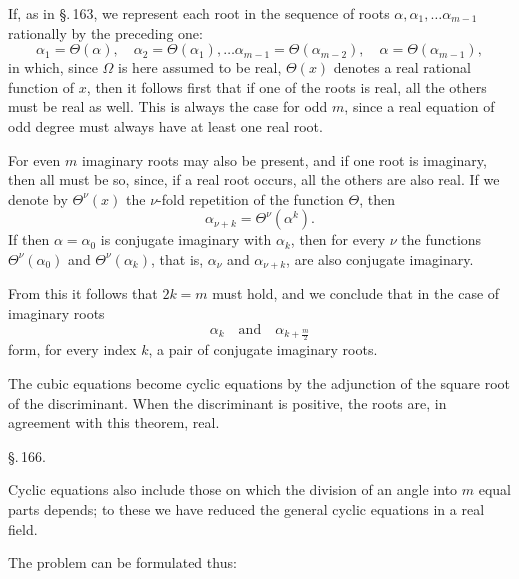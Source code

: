If, as in \S.\,163, we represent each root in the sequence of roots
$\alpha, \alpha_1, \ldots \alpha_{m-1}$ rationally by the preceding one:
\[
\alpha_1 = \Theta(\alpha), \quad \alpha_2 = \Theta(\alpha_1), \ldots \alpha_{m-1} = \Theta(\alpha_{m-2}), \quad \alpha = \Theta(\alpha_{m-1}),
\]
in which, since $\Omega$ is here assumed to be real, $\Theta(x)$ denotes a real rational function of $x$, then it follows first that if
one of the roots is real, all the others must be real as well.
This is always the case for odd $m$, since a real equation of odd degree must always have at least one real
root.

For even $m$ imaginary roots may also be present,
and if one root is imaginary, then all must be so,
since, if a real root occurs, all the others are also
real. If we denote by $\Theta^{\nu}(x)$ the $\nu$-fold repetition of the
function $\Theta$, then
\[
\alpha_{\nu+k} = \Theta^{\nu}(\alpha^k).
\]
If then $\alpha = \alpha_0$ is conjugate imaginary with $\alpha_k$, then for
every $\nu$ the functions $\Theta^{\nu}(\alpha_0)$ and $\Theta^{\nu}(\alpha_k)$, that is, $\alpha_{\nu}$ and $\alpha_{\nu+k}$,
are also conjugate imaginary.

From this it follows that $2k = m$ must hold, and we conclude
that in the case of imaginary roots
\[
\alpha_k \quad \text{and} \quad \alpha_{k + \frac{m}{2}}
\]
form, for every index $k$, a pair of conjugate imaginary roots.

The cubic equations become cyclic equations by the adjunction of the
square root of the discriminant.
When the discriminant is positive, the roots are, in
agreement with this theorem, real.

\begin{center}
\S.\,166.\\
\end{center}

Cyclic equations also include those
on which the division of an angle into $m$ equal parts depends; to these we have reduced the general cyclic equations in
a real field.

The problem can be formulated thus:

